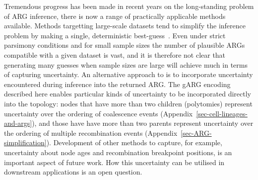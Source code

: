 \documentclass{article}
\newcommand{\relate}[0]{\texttt{Relate}}
\begin{document}
Tremendous progress has been made in recent years on the long-standing
problem of ARG inference, there is now a range of practically 
applicable methods available.
Methods targetting large-scale datasets tend to simplify
the inference problem by
making a single, deterministic 
best-guess~\citep{kelleher2019inferring,speidel2019method,zhang2023biobank,zhan2023towards}.
Even under strict parsimony conditions and for small sample sizes the
number of plausible ARGs compatible with a given dataset is vast,
and it is therefore not clear that generating many guesses
when sample sizes are large will achieve much in terms of capturing uncertainty.
An alternative approach to 
is to incorporate uncertainty encountered during inference into the returned ARG.
The gARG encoding described here enables particular kinds of uncertainty
to be incorporated directly into the topology:
nodes that have more than two children (polytomies)
represent uncertainty over the ordering of coalescence events 
(Appendix~\ref{sec-cell-lineages-and-args}), 
and those have have more than two parents 
represent uncertainty over the ordering of multiple recombination events
(Appendix~\ref{sec-ARG-simplification}). 
Development of other methods to capture, for example,
uncertainty about node ages and recombination breakpoint positions, is an important
aspect of future work.
How this uncertainty can be utilised in downstream applications
is an open question.

\end{document}
